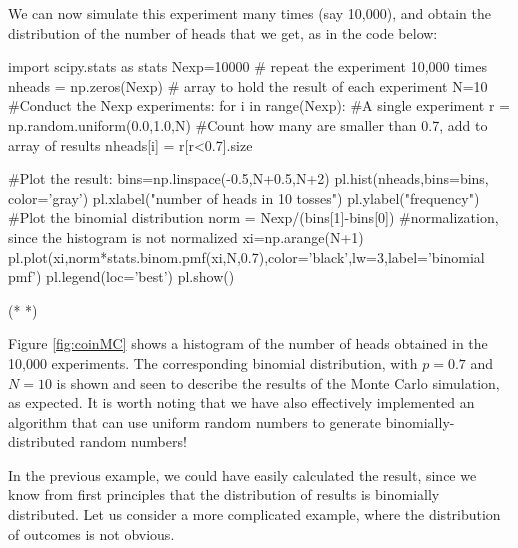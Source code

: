 We can now simulate this experiment many times (say 10,000), and obtain the distribution of the number of heads that we get, as in the code below:
\begin{python}[caption = Many simulations of throwing a coin 10 times] 
import scipy.stats as stats
Nexp=10000 # repeat the experiment 10,000 times
nheads = np.zeros(Nexp) # array to hold the result of each experiment
N=10
#Conduct the Nexp experiments:
for i in range(Nexp):
    #A single experiment
    r = np.random.uniform(0.0,1.0,N)
    #Count how many are smaller than 0.7, add to array of results
    nheads[i] = r[r<0.7].size    
    
#Plot the result:
bins=np.linspace(-0.5,N+0.5,N+2)
pl.hist(nheads,bins=bins, color='gray')
pl.xlabel("number of heads in 10 tosses")
pl.ylabel("frequency")
#Plot the binomial distribution
norm = Nexp/(bins[1]-bins[0]) #normalization, since the histogram is not normalized
xi=np.arange(N+1)
pl.plot(xi,norm*stats.binom.pmf(xi,N,0.7),color='black',lw=3,label='binomial pmf')
pl.legend(loc='best')
pl.show()
\end{python}
\begin{poutput}
(*  *)
\end{poutput}
Figure \ref{fig:coinMC} shows a histogram of the number of heads obtained in the 10,000 experiments. The corresponding binomial distribution, with $p=0.7$ and $N=10$ is shown and seen to describe the results of the Monte Carlo simulation, as expected. It is worth noting that we have also effectively implemented an algorithm that can use uniform random numbers to generate binomially-distributed random numbers!



In the previous example, we could have easily calculated the result, since we know from first principles that the distribution of results is binomially distributed. Let us consider a more complicated example, where the distribution of outcomes is not obvious.

